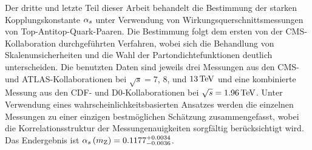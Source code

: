 % 
Der dritte und letzte Teil dieser Arbeit behandelt die Bestimmung der 
starken Kopplungskonstante $\alpha_s$ unter Verwendung von 
Wirkungsquerschnittsmessungen von Top-Antitop-Quark-Paaren.
% 
% 
Die Bestimmung folgt dem ersten von der CMS-Kollaboration 
durchgef{\"u}hrten Verfahren, wobei sich die Behandlung von 
Skalenunsicherheiten und die Wahl der Partondichtefunktionen deutlich 
unterscheiden.
% 
% 
Die benutzten Daten sind jeweils drei Messungen aus den CMS- und 
ATLAS-Kollaborationen bei $\sqrt{s}=7$, $8$, und $13\,\text{TeV}$ und eine kombinierte 
Messung aus den CDF- und D0-Kollaborationen bei $\sqrt{s}=1.96\,\text{TeV}$.
% 
% 
Unter Verwendung eines wahrscheinlichkeitsbasierten Ansatzes werden 
die einzelnen Messungen zu einer einzigen bestm{\"o}glichen Sch{\"a}tzung 
zusammengefasst, wobei die Korrelationsstruktur der Messungenauigkeiten 
sorgf{\"a}ltig ber{\"u}cksichtigt wird.
% 
% 
Das Endergebnis ist $\alpha_s \left( m_\mathrm{Z} \right)  = 0.1177^{+0.0034}_{-0.0036}$.
